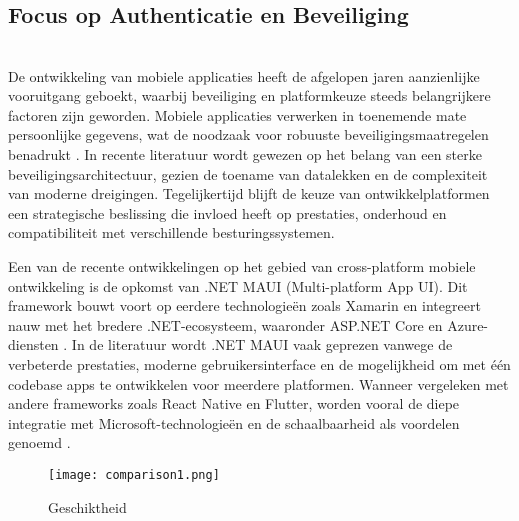 \chapter{}%
\label{ch:stand-van-zaken}


\section{Focus op Authenticatie en Beveiliging}\\

De ontwikkeling van mobiele applicaties heeft de afgelopen jaren aanzienlijke vooruitgang geboekt, waarbij beveiliging en platformkeuze steeds belangrijkere factoren zijn geworden. Mobiele applicaties verwerken in toenemende mate persoonlijke gegevens, wat de noodzaak voor robuuste beveiligingsmaatregelen benadrukt \autocite{build382022}. In recente literatuur wordt gewezen op het belang van een sterke beveiligingsarchitectuur, gezien de toename van datalekken en de complexiteit van moderne dreigingen. Tegelijkertijd blijft de keuze van ontwikkelplatformen een strategische beslissing die invloed heeft op prestaties, onderhoud en compatibiliteit met verschillende besturingssystemen.

Een van de recente ontwikkelingen op het gebied van cross-platform mobiele ontwikkeling is de opkomst van .NET MAUI (Multi-platform App UI). Dit framework bouwt voort op eerdere technologieën zoals Xamarin en integreert nauw met het bredere .NET-ecosysteem, waaronder ASP.NET Core en Azure-diensten \autocite{Klesman2023}. In de literatuur wordt .NET MAUI vaak geprezen vanwege de verbeterde prestaties, moderne gebruikersinterface en de mogelijkheid om met één codebase apps te ontwikkelen voor meerdere platformen. Wanneer vergeleken met andere frameworks zoals React Native en Flutter, worden vooral de diepe integratie met Microsoft-technologieën en de schaalbaarheid als voordelen genoemd \autocite{Kuppan2024}.

\begin{figure}
    \centering
    \texttt{[image: comparison1.png]}
    \caption[Integratie]{Geschiktheid}
\end{figure}

